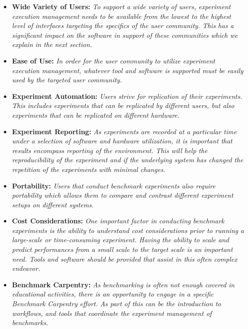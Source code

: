 \documentclass[sigconf]{acmart}
\begin{document}
\begin{BOX}

\begin{itemize}

\item {\bf Wide Variety of Users:} {\it To support a wide variety of users, experiment execution management needs to be available from the lowest to the highest level of interfaces targeting the specifics of the user community. This has a significant impact on the software in support of these communities which we explain in the next section.}
\item {\bf Ease of Use:} {\it In order for the user community to utilize experiment execution management, whatever tool and software is supported must be easily used by the targeted user community.}
\item {\bf Experiment Automation:} {\it Users strive for replication of their experiments. This includes experiments that can be replicated by different users, but also experiments that can be replicated on different hardware.}
\item {\bf Experiment Reporting:} {\it As experiments are recorded at a particular time under a selection of software and hardware utilization, it is important that results encompass reporting of the environment. This will help the reproducibility of the experiment and if the underlying system has changed the repetition of the experiments with minimal changes.}
\item {\bf Portability:} {\it Users that conduct benchmark experiments also require portability which allows them to compare and contrast different experiment setups on different systems.}
\item {\bf Cost Considerations:} {\it One important factor in conducting benchmark experiments is the ability to understand cost considerations prior to running a large-scale or time-consuming experiment. Having the ability to scale and predict performances from a small scale to the target scale is an important need. Tools and software should be provided that assist in this often complex endeavor.}
\item {\bf Benchmark Carpentry:} {\it As benchmarking is often not enough covered in educational activities, there is an opportunity to engage in a specific Benchmark Carpentry effort. As part of this can be the introduction to workflows, and tools that coordinate the experiment management of benchmarks.}
\end{itemize}
    
\end{BOX}
\end{document}
